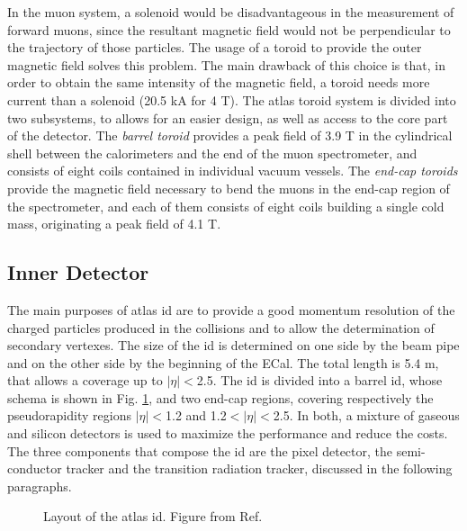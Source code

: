 In the muon system, a solenoid would be disadvantageous in the measurement of forward muons, since the resultant magnetic field would not be perpendicular to the trajectory of those particles. The usage of a toroid to provide the outer magnetic field solves this problem. The main drawback of this choice is that, in order to obtain the same intensity of the magnetic field, a toroid needs more current than a solenoid (20.5 kA for 4 T).
The \gls{atlas} toroid system is divided into two subsystems, to allows for an easier design, as well as access to the core part of the detector.
The \textit{barrel toroid} \cite{ATLAS:1997ac} provides a peak field of 3.9 T in the cylindrical shell between the calorimeters and the end of the muon spectrometer, and consists of eight coils contained in individual vacuum vessels.  
The \textit{end-cap toroids} \cite{ATLAS:1997ab} provide the magnetic field necessary to bend the muons in the end-cap region of the spectrometer, and each of them consists of eight coils building a single cold mass, originating a peak field of 4.1 T. 



\subsection{Inner Detector}
\label{sec:atlas:id}

The main purposes of \gls{atlas} \gls{id} \cite{ATLAS:1997ag,ATLAS:1997af} are to provide a good momentum resolution of the charged particles produced in the collisions and to allow the determination of secondary vertexes. The size of the \gls{id} is determined on one side by the beam pipe and on the other side by the beginning of the ECal. The total length is 5.4 m, that allows a coverage up to $|\eta|<$2.5.
The \gls{id} is divided into a barrel \gls{id}, whose schema is shown in Fig. \ref{fig:atlas:id}, and two end-cap regions, covering respectively the pseudorapidity regions $|\eta|<$1.2 and 1.2$<|\eta|<$2.5. In both, a mixture of gaseous and silicon detectors is used to maximize the performance and reduce the costs. The three components that compose the \gls{id} are the pixel detector, the semi-conductor tracker and the transition radiation tracker, discussed in the following paragraphs.

\begin{figure}[ht]
\centering
{}
\caption{Layout of the \gls{atlas} \gls{id}. Figure from Ref. \cite{Potamianos:2016ptf}}
\label{fig:atlas:id}
\end{figure}


